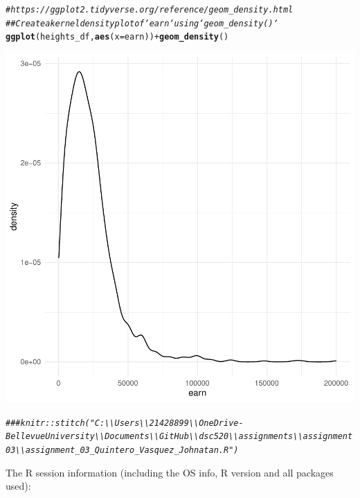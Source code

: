 \documentclass{article}\usepackage[]{graphicx}\usepackage[]{xcolor}
\makeatletter
\newcommand{\hlcom}[1]{\textcolor[rgb]{0.678,0.584,0.686}{\textit{#1}}}%
\newcommand{\hlopt}[1]{\textcolor[rgb]{0,0,0}{#1}}%
\newcommand{\hlstd}[1]{\textcolor[rgb]{0.345,0.345,0.345}{#1}}%
\newcommand{\hlkwc}[1]{\textcolor[rgb]{0.333,0.667,0.333}{#1}}%
\newcommand{\hlkwd}[1]{\textcolor[rgb]{0.737,0.353,0.396}{\textbf{#1}}}%
\newenvironment{kframe}{%
 \def\at@end@of@kframe{}%
 \ifinner\ifhmode%
  \def\at@end@of@kframe{\end{minipage}}%
  \begin{minipage}{\columnwidth}%
 \fi\fi%
 \def\FrameCommand##1{\hskip\@totalleftmargin \hskip-\fboxsep
 \colorbox{shadecolor}{##1}\hskip-\fboxsep
     \hskip-\linewidth \hskip-\@totalleftmargin \hskip\columnwidth}%
 \MakeFramed {\advance\hsize-\width
   \@totalleftmargin\z@ \linewidth\hsize
   \@setminipage}}%
 {\par\unskip\endMakeFramed%
 \at@end@of@kframe}
\newenvironment{knitrout}{}{} %
\makeatother
\begin{document}
\begin{knitrout}
{}


\begin{kframe}\begin{alltt}
\hlcom{# https://ggplot2.tidyverse.org/reference/geom_density.html}
\hlcom{## Create a kernel density plot of `earn` using `geom_density()`}
\hlkwd{ggplot}\hlstd{(heights_df,} \hlkwd{aes}\hlstd{(}\hlkwc{x} \hlstd{= earn))} \hlopt{+} \hlkwd{geom_density}\hlstd{()}
\end{alltt}
\end{kframe}

{\centering \includegraphics[width=.6\linewidth]{figure/assignment-03-Quintero-Vasquez-Johnatan-Rnwauto-report-11} 

}


\begin{kframe}\begin{alltt}
\hlcom{### knitr::stitch("C:\textbackslash{}\textbackslash{}Users\textbackslash{}\textbackslash{}21428899\textbackslash{}\textbackslash{}OneDrive-Bellevue University\textbackslash{}\textbackslash{}Documents\textbackslash{}\textbackslash{}GitHub\textbackslash{}\textbackslash{}dsc520\textbackslash{}\textbackslash{}assignments\textbackslash{}\textbackslash{}assignment03\textbackslash{}\textbackslash{}assignment_03_Quintero_Vasquez_Johnatan.R")}
\end{alltt}
\end{kframe}
\end{knitrout}

The R session information (including the OS info, R version and all
packages used):
\end{document}
